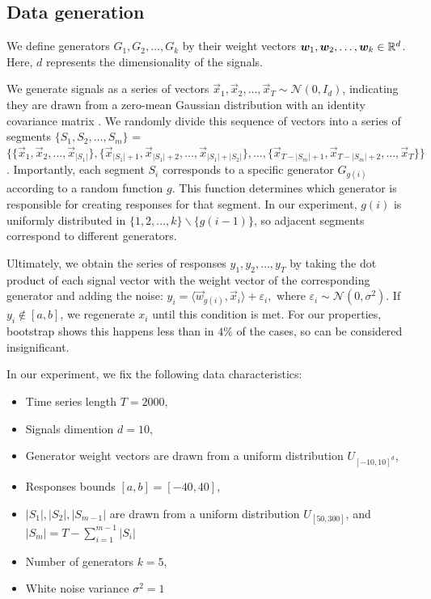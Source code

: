 \documentclass[12pt, twoside]{article}
\begin{document}
\subsection{Data generation}

We define generators $G_1, G_2, \dots, G_k$ by their weight vectors $\boldsymbol{w}_1, \boldsymbol{w}_2, \dots, \boldsymbol{w}_k \in \mathbb{R}^d$. 
Here, $d$ represents the dimensionality of the signals.

We generate signals as a series of vectors $\vec x_1, \vec x_2, \dots, \vec x_T \sim \mathcal{N}(0, I_d)$, indicating they are drawn from a zero-mean Gaussian distribution with an identity covariance matrix .
We randomly divide this sequence of vectors into a series of segments $\{S_1, S_2, \dots, S_m\}$ = $\{\{ \vec x_1, \vec x_2, \dots, \vec x_{|S_1|}\}, \{\vec x_{|S_1|+1}, \vec x_{|S_1|+2}, \dots, \vec x_{|S_1| + |S_2|}\}, \dots, \{\vec x_{T-|S_m|+1}, \vec x_{T-|S_m|+2}, \dots, \vec x_{T}\}\}$. 
Importantly, each segment $S_i$ corresponds to a specific generator $G_{g(i)}$ according to a random function $g$. 
This function determines which generator is responsible for creating responses for that segment. In our experiment, $g(i)$ is uniformly distributed in $\{1, 2, \dots, k\} \backslash \{g(i-1)\}$, so adjacent segments correspond to different generators.

Ultimately, we obtain the series of responses $y_1, y_2, \dots, y_T$ by taking the dot product of each signal vector with the weight vector of the corresponding  generator and adding the noise: $y_i = \langle \vec w_{g(i)}, \vec x_i \rangle + \varepsilon_i,$ where $\varepsilon_i \sim \mathcal{N}(0, \sigma^2)$. If $y_i  \notin [a, b]$, we regenerate $x_i$ until this condition is met. For our properties, bootstrap shows this happens less than in $4\%$ of the cases, so can be considered insignificant.
\vspace{2mm}

In our experiment, we fix the following data characteristics:
\begin{itemize}
\item Time series length $T = 2000$,
\item Signals dimention $d=10$,
\item Generator weight vectors are drawn from a uniform distribution $U_{[-10, 10]^d}$,
\item Responses bounds $[a, b] = [-40, 40]$,
\item $|S_1|, |S_2|, |S_{m-1}|$ are drawn from a uniform distribution $U_{[50, 300]}$, and $|S_m| = T-\sum_{i=1}^{m-1}|S_i|$
\item Number of generators $k = 5$,
\item White noise variance $\sigma^2= 1$
\end{itemize}
\end{document}
